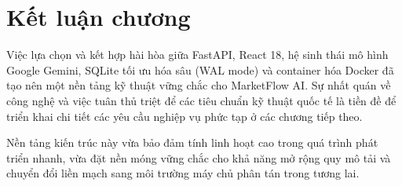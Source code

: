 \section{Kết luận chương}

Việc lựa chọn và kết hợp hài hòa giữa FastAPI, React 18, hệ sinh thái mô hình Google Gemini, SQLite tối ưu hóa sâu (WAL mode) và container hóa Docker đã tạo nên một nền tảng kỹ thuật vững chắc cho MarketFlow AI. Sự nhất quán về công nghệ và việc tuân thủ triệt để các tiêu chuẩn kỹ thuật quốc tế là tiền đề để triển khai chi tiết các yêu cầu nghiệp vụ phức tạp ở các chương tiếp theo.

Nền tảng kiến trúc này vừa bảo đảm tính linh hoạt cao trong quá trình phát triển nhanh, vừa đặt nền móng vững chắc cho khả năng mở rộng quy mô tải và chuyển đổi liền mạch sang môi trường máy chủ phân tán trong tương lai.
